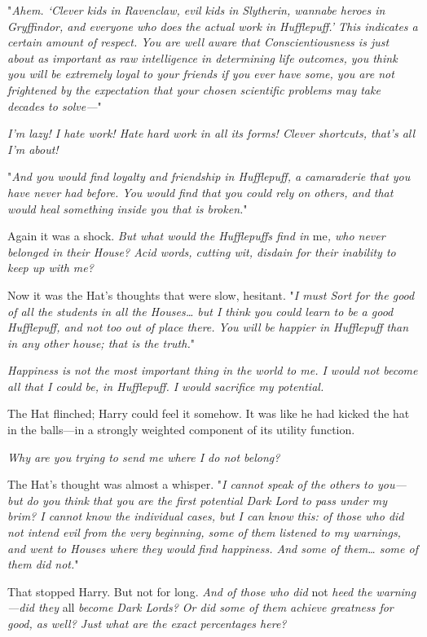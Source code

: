 "\emph{Ahem. `Clever kids in Ravenclaw, evil kids in Slytherin, wannabe heroes
in Gryffindor, and everyone who does the actual work in Hufflepuff.' This
indicates a certain amount of respect. You are well aware that
Conscientiousness is just about as important as raw intelligence in determining
life outcomes, you think you will be extremely loyal to your friends if you
ever have some, you are not frightened by the expectation that your chosen
scientific problems may take decades to solve---}"

\emph{I'm lazy! I hate work! Hate hard work in all its forms! Clever shortcuts,
that's all I'm about!}

"\emph{And you would find loyalty and friendship in Hufflepuff, a camaraderie
that you have never had before. You would find that you could rely on others,
and that would heal something inside you that is broken.}"

Again it was a shock. \emph{But what would the Hufflepuffs find in} me\emph{,
who never belonged in their House? Acid words, cutting wit, disdain for their
inability to keep up with me?}

Now it was the Hat's thoughts that were slow, hesitant. "\emph{I must Sort for
the good of all the students in all the Houses{\ldots} but I think you could
learn to be a good Hufflepuff, and not too out of place there. You will be
happier in Hufflepuff than in any other house; that is the truth.}"

\emph{Happiness is not the most important thing in the world to me. I would not
become all that I could be, in Hufflepuff. I would sacrifice my potential.}

The Hat flinched; Harry could feel it somehow. It was like he had kicked the
hat in the balls---in a strongly weighted component of its utility function.

\emph{Why are you trying to send me where I do not belong?}

The Hat's thought was almost a whisper. "\emph{I cannot speak of the others to
you---but do you think that you are the first potential Dark Lord to pass under
my brim? I cannot know the individual cases, but I can know this: of those who
did not intend evil from the very beginning, some of them listened to my
warnings, and went to Houses where they would find happiness. And some of
them{\ldots} some of them did not.}"

That stopped Harry. But not for long. \emph{And of those who did} not
\emph{heed the warning---did they} all \emph{become Dark Lords? Or did some of them
achieve greatness for good, as well? Just what are the exact percentages here?}


